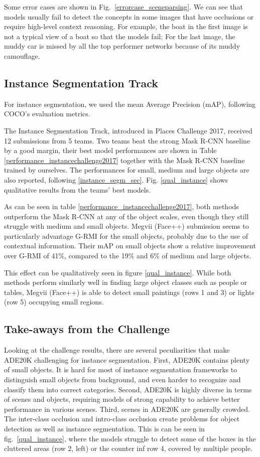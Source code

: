 Some error cases are shown in Fig.~\ref{errorcase_sceneparsing}. We can see that models usually fail to detect the concepts in some images that have occlusions or require high-level context reasoning. For example, the boat in the first image is not a typical view of a boat so that the models fail; For the last image, the muddy car is missed by all the top performer networks because of its muddy camouflage. 

\subsection{Instance Segmentation Track}

For instance segmentation, we used the mean Average Precision (mAP), following COCO's evaluation metrics.

The Instance Segmentation Track, introduced in Places Challenge 2017, received 12 submissions from 5 teams. Two teams beat the strong Mask R-CNN baseline by a good margin, their best model performances are shown in Table \ref{performance_instancechallenge2017} together with the Mask R-CNN baseline trained by ourselves. The performances for small, medium and large objects are also reported, following \ref{instance_segm_sec}. Fig. \ref{qual_instance} shows qualitative results from the teams' best models.

As can be seen in table \ref{performance_instancechallenge2017}, both methods outperform the Mask R-CNN at any of the object scales, even though they still struggle with medium and small objects. Megvii (Face++) submission seems to particularly advantage G-RMI for the small objects, probably due to the use of contextual information. Their mAP on small objects show a relative improvement over G-RMI of 41\%, compared to the 19\% and 6\% of medium and large objects.  

This effect can be qualitatively seen in figure \ref{qual_instance}. While both methods perform similarly well in finding large object classes such as people or tables, Megvii (Face++) is able to detect small paintings (rows 1 and 3) or lights (row 5) occupying small regions.

\subsection{Take-aways from the Challenge} Looking at the challenge results, there are several peculiarities that make ADE20K challenging for instance segmentation. First, ADE20K contains plenty of small objects. It is hard for most of instance segmentation frameworks to distinguish small objects from background, and even harder to recognize and classify them into correct categories. Second, ADE20K is highly diverse in terms of scenes and objects, requiring models of strong capability to achieve better performance in various scenes. Third, scenes in ADE20K are generally crowded. The inter-class occlusion and intro-class occlusion create problems for object detection as well as instance segmentation. This is can be seen in fig.~\ref{qual_instance}, where the models struggle to detect some of the boxes in the cluttered areas (row 2, left) or the counter inf row 4, covered by multiple people.  

